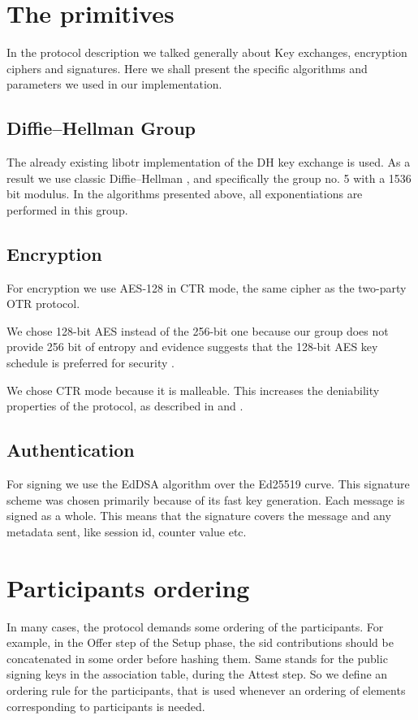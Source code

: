 \section{The primitives}
\label{setions:Protocol:primitives}
In the protocol description we talked generally about \dhname Key exchanges, encryption ciphers and signatures.
Here we shall present the specific algorithms and parameters we used in our implementation.

\subsection{Diffie--Hellman Group}
The already existing libotr implementation of the DH key exchange is used.
As a result we use classic Diffie--Hellman , and specifically the group no. 5 \cite{website:dh-rfc} with a 1536 bit modulus.
In the algorithms presented above, all exponentiations are performed in this group.

\subsection{Encryption}

For encryption we use AES-128 in CTR mode, the same cipher as the two-party OTR protocol.

We chose 128-bit AES instead of the 256-bit one because our \dhname group does not provide 256 bit of entropy and evidence suggests that the 128-bit AES key schedule is preferred for security \cite{aes-key-recov} \cite{rijndael-improved-analysis}.

We chose CTR mode because it is malleable.
This increases the deniability properties of the protocol, as described in \cite{otr} and \cite{otr_improvedauth}.

\subsection{Authentication}
For signing we use the EdDSA algorithm over the Ed25519 curve.
This signature scheme was chosen primarily because of its fast key generation.
Each message is signed as a whole.
This means that the signature covers the message and any metadata sent, like session id, counter value etc.

\section{Participants ordering}
\label{sections:participants_ordering}
In many cases, the protocol demands some ordering of the participants. For example, in the Offer step of the Setup phase, the sid contributions should be concatenated in some order before hashing them. Same stands for the public signing keys in the association table, during the Attest step. So we define an ordering rule for the participants, that is used whenever an ordering of elements corresponding to participants is needed.

